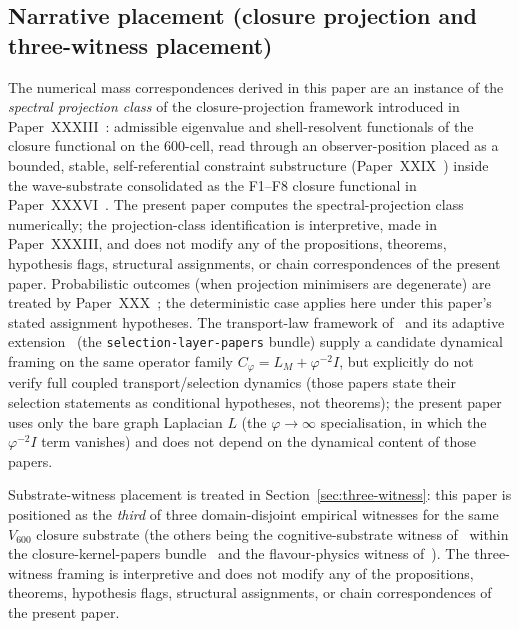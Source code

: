 \documentclass[12pt]{article}
\begin{document}
\subsection*{Narrative placement (closure projection and three-witness placement)}

The numerical mass correspondences derived in this paper are an instance of the \textit{spectral projection class} of the closure-projection framework introduced in Paper~XXXIII~\citep{SmartXXXIII}: admissible eigenvalue and shell-resolvent functionals of the closure functional on the 600-cell, read through an observer-position placed as a bounded, stable, self-referential constraint substructure (Paper~XXIX~\citep{SmartXXIX}) inside the wave-substrate consolidated as the F1--F8 closure functional in Paper~XXXVI~\citep{SmartXXXVI}. The present paper computes the spectral-projection class numerically; the projection-class identification is interpretive, made in Paper~XXXIII, and does not modify any of the propositions, theorems, hypothesis flags, structural assignments, or chain correspondences of the present paper. Probabilistic outcomes (when projection minimisers are degenerate) are treated by Paper~XXX~\citep{SmartXXX}; the deterministic case applies here under this paper's stated assignment hypotheses. The transport-law framework of~\citep{SmartTransportLaw} and its adaptive extension~\citep{SmartACT} (the \texttt{selection-layer-papers} bundle) supply a candidate dynamical framing on the same operator family $C_\varphi = L_M + \varphi^{-2} I$, but explicitly do not verify full coupled transport/selection dynamics (those papers state their selection statements as conditional hypotheses, not theorems); the present paper uses only the bare graph Laplacian $L$ (the $\varphi \to \infty$ specialisation, in which the $\varphi^{-2} I$ term vanishes) and does not depend on the dynamical content of those papers.

Substrate-witness placement is treated in Section~\ref{sec:three-witness}: this paper is positioned as the \emph{third} of three domain-disjoint empirical witnesses for the same $V_{600}$ closure substrate (the others being the cognitive-substrate witness of~\citep{SmartARIAChess2026} within the closure-kernel-papers bundle~\citep{SmartARIAClosureKernel2026} and the flavour-physics witness of~\citep{SmartBAnomaly}). The three-witness framing is interpretive and does not modify any of the propositions, theorems, hypothesis flags, structural assignments, or chain correspondences of the present paper.
\end{document}
